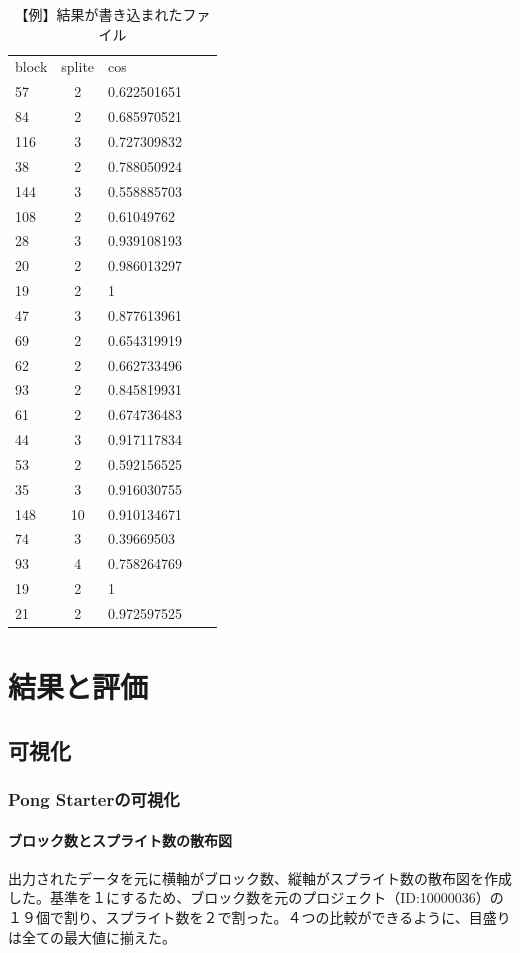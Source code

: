 \documentclass[a4paper,10pt,onecolumn,oneside,openany]{jsbook}
\begin{document}
\begin{table}[h]
 \caption{【例】結果が書き込まれたファイル}
 \label{resultex}
 \begin{center}
\begin{tabular}{lclcl}
block & splite & cos \\
57 & 2 & 0.622501651 \\
84 & 2 & 0.685970521 \\
116 & 3 & 0.727309832 \\
38 & 2 & 0.788050924 \\
144 & 3 & 0.558885703 \\
108 & 2 & 0.61049762 \\
28 & 3 & 0.939108193 \\
20 & 2 & 0.986013297 \\
19 & 2 & 1 \\
47 & 3 & 0.877613961 \\
69 & 2 & 0.654319919 \\
62 & 2 & 0.662733496 \\
93 & 2 & 0.845819931 \\
61 & 2 & 0.674736483 \\
44 & 3 & 0.917117834 \\
53 & 2 & 0.592156525 \\
35 & 3 & 0.916030755 \\
148 & 10 & 0.910134671 \\
74 & 3 & 0.39669503 \\
93 & 4 & 0.758264769 \\
19 & 2 & 1 \\
21 & 2 & 0.972597525 \\
\end{tabular}
\end{center}
\end{table}




\part{結果と評価}
\chapter{可視化}
\section{Pong Starterの可視化}

\subsection{ブロック数とスプライト数の散布図}
出力されたデータを元に横軸がブロック数、縦軸がスプライト数の散布図を作成した。基準を１にするため、ブロック数を元のプロジェクト（ID:10000036）の１９個で割り、スプライト数を２で割った。４つの比較ができるように、目盛りは全ての最大値に揃えた。
\end{document}
